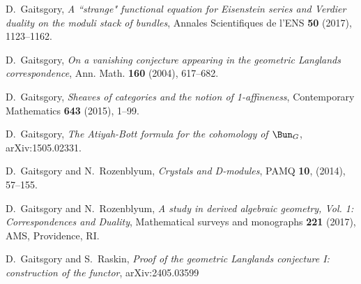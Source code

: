 \documentclass[9pt]{amsart}
\theoremstyle{remark}
\theoremstyle{definition}
\theoremstyle{remark}
\numberwithin{equation}{section}
\begin{document}
\begin{thebibliography}{99}

 D.~Gaitsgory, {\it A ``strange" functional equation for Eisenstein series and Verdier
duality on the moduli stack of bundles}, Annales Scientifiques de l'ENS {\bf 50} (2017), 1123--1162. 

 D.~Gaitsgory, {\it On a vanishing conjecture appearing in the geometric Langlands correspondence}, 
Ann. Math. {\bf 160} (2004), 617--682.

 D.~Gaitsgory, {\it Sheaves of categories and the notion of 1-affineness}, Contemporary Mathematics {\bf 643}  (2015), 1--99.

 D.~Gaitsgory, {\it The Atiyah-Bott formula for the cohomology of $\Bun_G$}, arXiv:1505.02331. 




%


%

  D.~Gaitsgory and N.~Rozenblyum, {\it Crystals and D-modules}, PAMQ {\bf 10}, (2014), 57--155.

  D.~Gaitsgory and N.~Rozenblyum, {\it A study in derived algebraic geometry, Vol. 1: Correspondences and Duality}, 
Mathematical surveys and monographs {\bf 221} (2017), AMS, Providence, RI.

 D.~Gaitsgory and S.~Raskin, {\it Proof of the geometric Langlands conjecture I: construction of the functor}, \hfill\newline
arXiv:2405.03599


\end{thebibliography}
\end{document}
